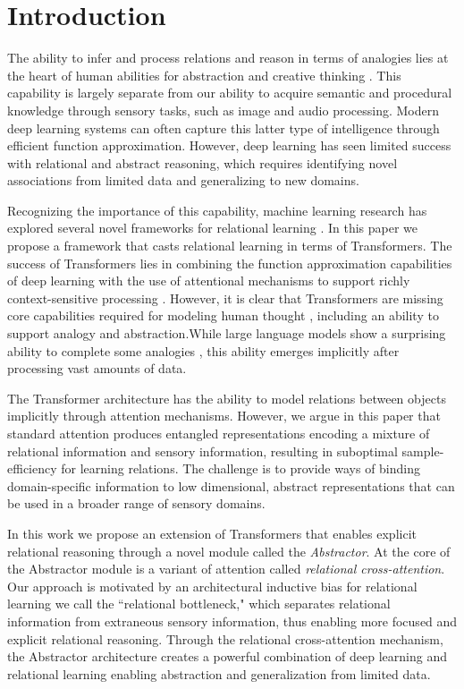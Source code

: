 \section{Introduction}

The ability to infer and process relations and reason in terms of analogies lies at the heart of human abilities for abstraction and creative thinking
\citep{snow,holyoak}. This capability is largely separate from our ability to acquire semantic and procedural knowledge through sensory tasks, such as image and audio processing. Modern deep learning systems can often capture this latter type of intelligence through efficient function approximation. However, deep learning has seen limited success with relational and abstract reasoning, which requires identifying novel associations from limited data and generalizing to new domains.

Recognizing the importance of this capability, machine learning research has explored several novel frameworks for relational learning \citep{TEM, NTM,episodicControl,shanahanExplicitlyRelationalNeural,esbn,mondal23learned,battaglia,barrett:2018,santoro1}. In this paper we propose a framework that casts relational learning in terms of Transformers. The success of Transformers lies in combining the function approximation capabilities of deep learning with the use of attentional mechanisms to support richly context-sensitive processing \citep{transformers,vaswani2017attention,kerg2020untangling}. However, it is clear that Transformers are missing core capabilities required for modeling human thought \citep{mahowald2023dissociating}, including an ability to support analogy and abstraction.While large language models show a surprising ability to complete some analogies \citep{webb}, this ability emerges implicitly after processing vast amounts of data.

The Transformer architecture has the ability to model relations between objects implicitly through attention mechanisms. However, we argue in this paper that standard attention produces entangled representations encoding a mixture of relational information and sensory information, resulting in suboptimal sample-efficiency for learning relations. The challenge is to provide ways of binding domain-specific information to low dimensional, abstract representations that can be used in a broader range of sensory domains.

In this work we propose an extension of Transformers that enables explicit relational reasoning through a novel module called the \textit{Abstractor}. At the core of the Abstractor module is a variant of attention called \textit{relational cross-attention}. Our approach is motivated by an architectural inductive bias for relational learning we call the ``relational bottleneck," which separates relational information from extraneous sensory information, thus enabling more focused and explicit relational reasoning. Through the relational cross-attention mechanism, the Abstractor architecture creates a powerful combination of deep learning and relational learning enabling abstraction and generalization from limited data.

